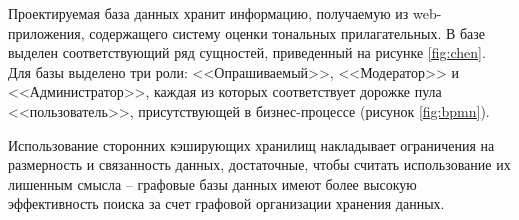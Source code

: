 Проектируемая база данных хранит информацию, получаемую из web-приложения, содержащего систему оценки тональных прилагательных. В базе выделен соответствующий ряд сущностей, приведенный на рисунке \ref{fig:chen}. Для базы выделено три роли: <<Опрашиваемый>>, <<Модератор>> и <<Администратор>>, каждая из которых соответствует дорожке пула <<пользователь>>, присутствующей в бизнес-процессе (рисунок \ref{fig:bpmn}). 

Использование сторонних кэширующих хранилищ накладывает ограничения на размерность и связанность данных, достаточные, чтобы считать использование их лишенным смысла -- графовые базы данных имеют более высокую эффективность поиска за счет графовой организации хранения данных.


